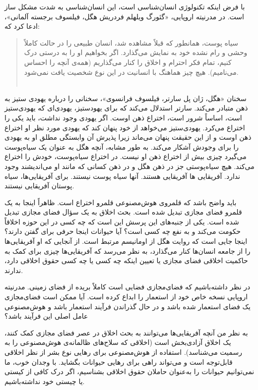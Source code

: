 با فرض اینکه تکنولوژی انسان‌شناسی است، این انسان‌شناسی به شدت مشکل ساز است.
در مدرنیته اروپایی، «گئورگ ویلهلم فردریش هگل، فیلسوف برجسته آلمانی»، ادعا کرد که:

\begin{quote}
    سیاه پوست، همانطور که قبلاً مشاهده شد، انسان طبیعی را در حالت کاملاً وحشی و رام نشده خود به نمایش می‌گذارد.
    اگر بخواهیم او را به درستی درک کنیم، تمام فکر احترام و اخلاق را کنار می‌گذاریم (همه‌ی آنچه را احساس می‌نامیم).
    هیچ چیز هماهنگ با انسانیت در این نوع شخصیت یافت نمی‌شود.
    \\\\
    \newline
    \newline
\end{quote}

سخنان «هگل، ژان پل سارتر، فیلسوف فرانسوی»، سخنانی را درباره یهودی ستیز به ذهن متبادر می‌کند.
سارتر استدلال می‌کند که برای یهودستیز، یهودی‌ای که یهودی‌ستیز است، اساساً شرور است، اختراع ذهن اوست.
اگر یهودی وجود نداشت، باید یکی را اختراع می‌کرد.
یهودی‌ستیز می‌خواهد از خود پنهان کند که یهودی مورد نظر او اختراع ذهن اوست و از این حقیقت پنهان می‌ماند زیرا پذیرش آن وابستگی مطلق او به یهودی را برای وجودش آشکار می‌کند.
به طور مشابه، آنچه هگل به عنوان یک سیاه‌پوست می‌گیرد چیزی بیش از اختراع ذهن او نیست.
در اختراع سیاه‌پوست، خودش را اختراع می‌کند.
هیچ سیاه‌پوستی جز در ذهن هگل و در ذهن کسانی که مانند او می‌اندیشند وجود ندارد.
آفریقایی ها آفریقایی هستند.
آنها سیاه پوست نیستند.
برای آفریقایی‌ها، سیاه پوستان آفریقایی نیستند.

باید واضح باشد که قلمروی هوش‌مصنوعی قلمرو اختراع است.
ظاهراً اینجا به یک قلمرو فضای مجازی تبدیل شده است.
بحث اخلاق به یک سؤال فضای مجازی تبدیل شده است.
یکی از جنبه‌های این پرسش این است که چه کسی در این حوزه اخلاقاً حکومت می‌کند و به نفع چه کسی است؟ آیا حیوانات اینجا حرفی برای گفتن دارند؟ اینجا جایی است که روایت هگل از اومانیسم مرتبط است.
از آنجایی که او آفریقایی‌ها را از جامعه انسان‌ها کنار می‌گذارد، به نظر می‌رسد که آفریقایی‌ها چیزی برای کمک به حاکمیت اخلاقی فضای مجازی یا تعیین اینکه چه کسی یا چه کسی حقوق اخلاقی دارد، ندارند.

در نظر داشته‌باشیم که فضای‌مجازی فضایی است کاملاً بریده از فضای زمینی.
مدرنیته اروپایی نسخه خاص خود از استعمار را ابداع کرده است.
آیا ممکن است فضای‌مجازی یک فضای استعمار شده باشد و در حال گذراندن فرآیند استعمار باشد و هوش‌مصنوعی عامل اصلی این فرآیند باشد؟

به نظر من آنچه آفریقایی‌ها می‌توانند به بحث اخلاق در عصر فضای مجازی کمک کنند، یک اخلاق آزادی‌بخش است (اخلاقی که سلاح‌های ظالمانه‌ی هوش‌مصنوعی را به رسمیت می‌شناسد).
استفاده از هوش‌مصنوعی برای رهایی نوع بشر از نظر اخلاقی قابل‌توجه است و می‌تواند راهی برای رهایی حیوانات بگشاید.
با وجدان خوب، ما نمی‌توانیم حیوانات را به‌عنوان حاملان حقوق اخلاقی بشناسیم، اگر درک کافی از کیستی یا چیستی خود نداشته‌باشیم.

